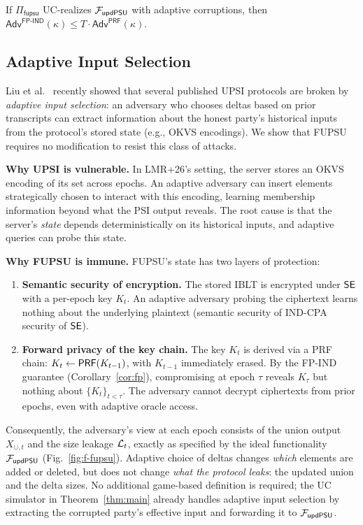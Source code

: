\begin{corollary}\label{cor:fp}
If $\Pi_{\mathsf{fupsu}}$ UC-realizes $\mathcal{F}_{\mathsf{updPSU}}$ with adaptive
corruptions, then $\mathsf{Adv}^{\mathsf{FP\text{-}IND}}(\kappa) \leq T \cdot
\mathsf{Adv}^{\mathsf{PRF}}(\kappa)$.
\end{corollary}

\subsection{Adaptive Input Selection}

Liu et al.~\cite{LMR+26} recently showed that several published UPSI protocols
are broken by \emph{adaptive input selection}: an adversary who chooses deltas
based on prior transcripts can extract information about the honest party's
historical inputs from the protocol's stored state (e.g., OKVS encodings). We
show that FUPSU requires no modification to resist this class of attacks.

\smallskip\noindent\textbf{Why UPSI is vulnerable.}
In LMR+26's setting, the server stores an OKVS encoding of its set across
epochs. An adaptive adversary can insert elements strategically chosen to
interact with this encoding, learning membership information beyond what the
PSI output reveals. The root cause is that the server's \emph{state} depends
deterministically on its historical inputs, and adaptive queries can probe
this state.

\smallskip\noindent\textbf{Why FUPSU is immune.}
FUPSU's state has two layers of protection:
\begin{enumerate}
\item \textbf{Semantic security of encryption.} The stored IBLT is encrypted
under $\mathsf{SE}$ with a per-epoch key $K_t$. An adaptive adversary probing the
ciphertext learns nothing about the underlying plaintext (semantic security of
IND-CPA security of $\mathsf{SE}$).
\item \textbf{Forward privacy of the key chain.} The key $K_t$ is derived via a
PRF chain: $K_t \leftarrow \mathsf{PRF}(K_{t-1})$, with $K_{t-1}$ immediately erased.
By the FP-IND guarantee (Corollary~\ref{cor:fp}), compromising at epoch $\tau$
reveals $K_\tau$ but nothing about $\{K_t\}_{t < \tau}$. The adversary cannot
decrypt ciphertexts from prior epochs, even with adaptive oracle access.
\end{enumerate}

Consequently, the adversary's view at each epoch consists of the union output
$X_{\cup,t}$ and the size leakage $\mathcal{L}_t$, exactly as specified by the ideal
functionality $\mathcal{F}_{\mathsf{updPSU}}$ (Fig.~\ref{fig:f-fupsu}). Adaptive choice
of deltas changes \emph{which} elements are added or deleted, but does not
change \emph{what the protocol leaks}: the updated union and the delta sizes.
No additional game-based definition is required; the UC simulator in
Theorem~\ref{thm:main} already handles adaptive input selection by extracting
the corrupted party's effective input and forwarding it to $\mathcal{F}_{\mathsf{updPSU}}$.

